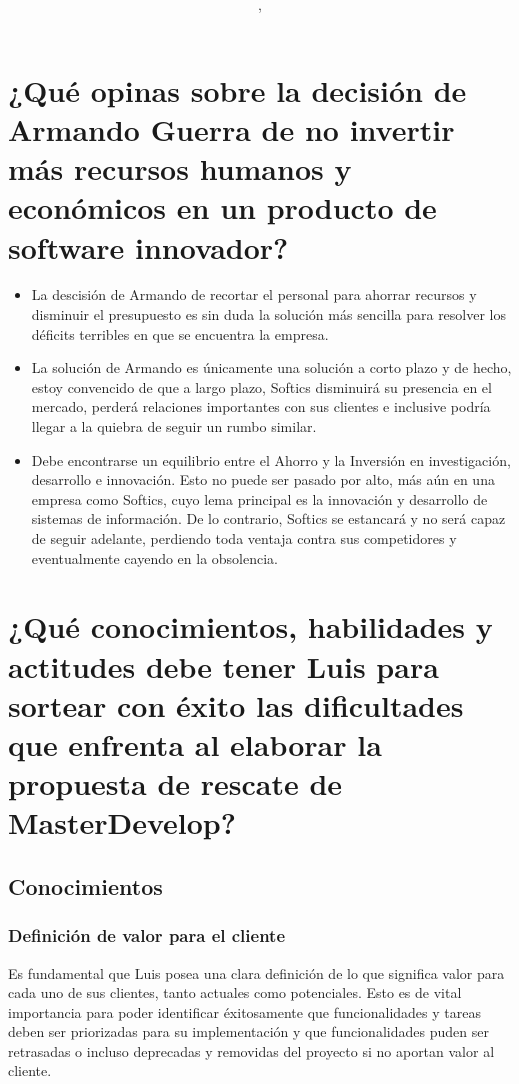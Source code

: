 \documentclass{article}
\author{\nombre , \carnet}
\title{\textbf{\Huge\titulo}}
\begin{document}
\maketitle
\section{¿Qué opinas sobre la decisión de Armando Guerra de no invertir más recursos humanos
    y económicos en un producto de software innovador?}
\begin{itemize}
	\item  La descisión de Armando de recortar el personal para
		ahorrar recursos y disminuir el presupuesto
		es sin duda la solución más sencilla para resolver
		los déficits terribles en que se encuentra la empresa.

	\item La solución de Armando es únicamente una solución
		a corto plazo y de hecho, 
		estoy convencido de que a largo plazo,
		Softics disminuirá su presencia en el mercado, 
		perderá relaciones importantes con sus clientes e
		inclusive podría llegar a la quiebra de seguir un 
		rumbo similar.

	\item Debe encontrarse un equilibrio entre el Ahorro
		y la Inversión en investigación, desarrollo e 
		innovación. Esto no puede ser pasado por alto,
		más aún en una empresa como Softics, cuyo lema
		principal es la innovación y desarrollo de 
		sistemas de información. De lo contrario, 
		Softics se estancará y no será capaz de 
		seguir adelante, perdiendo toda ventaja contra sus
		competidores y eventualmente cayendo en la obsolencia.
\end{itemize}

\section{¿Qué conocimientos, habilidades y actitudes debe tener Luis para sortear con éxito
    las dificultades que enfrenta al elaborar la propuesta de rescate de MasterDevelop?}
    \subsection{Conocimientos}
    \subsubsection{Definición de valor para el cliente}
    	Es fundamental que Luis posea una clara definición de lo que
	significa valor para cada uno de sus clientes, tanto actuales
	como potenciales. Esto es de vital importancia para poder 
	identificar éxitosamente que funcionalidades y tareas 
	deben ser priorizadas para su implementación y que 
	funcionalidades puden ser retrasadas o incluso deprecadas
	y removidas del proyecto si no aportan valor al cliente.
\end{document}
